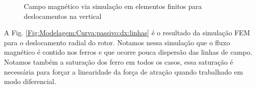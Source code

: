 \begin{figure}[!ht]
	\centering
		\label{Fig:Modelagem:Curva:passivo:dy:linhas:0}
		\label{Fig:Modelagem:Curva:passivo:dy:linhas:1,2}
	\caption{Campo magnético via simulação em elementos finitos para deslocamentos na vertical}
	\label{Fig:Modelagem:Curva:passivo:dy:linhas}
\end{figure}

A Fig. \ref{Fig:Modelagem:Curva:passivo:dx:linhas} é o resultado da simulação FEM para o deslocamento radial do rotor. Notamos nessa simulação que o fluxo magnético é contido nos ferros e que ocorre pouca dispersão das linhas de campo. Notamos também a saturação dos ferro em todos os casos, essa saturação é necessária para forçar a linearidade da força de atração quando trabalhado em modo diferencial.

